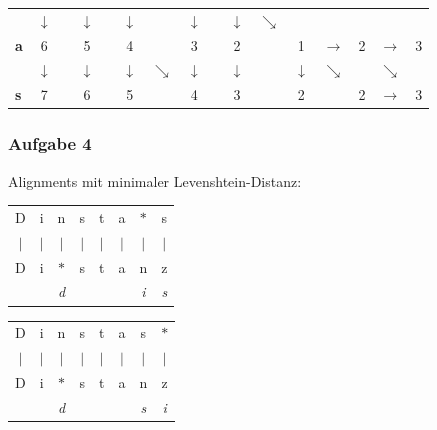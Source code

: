 \documentclass{beamer}
\begin{document}
\begin{frame}
\begin{tabular}{l|ccccccccccccccc}
				& $\downarrow$ &       & $\downarrow$ &       & $\downarrow$ &       & $\downarrow$ &       & $\downarrow$ & $\searrow$ &       &       &       &       &  \\
				\textbf{a}     & 6     &       & 5     &       & 4     &       & 3     &       & 2     &       & 1     & $\rightarrow$ & 2     & $\rightarrow$ & 3 \\
				& $\downarrow$ &       & $\downarrow$ &       & $\downarrow$ & $\searrow$ & $\downarrow$ &       & $\downarrow$ &       & $\downarrow$ & $\searrow$ &       & $\searrow$ &  \\
				\textbf{s}     & 7     &       & 6     &       & 5     &       & 4     &       & 3     &       & 2     &       & 2     & $\rightarrow$ & 3 \\
			\end{tabular}
\end{frame}

\begin{frame} \frametitle{Aufgabe 4}
	Alignments mit minimaler Levenshtein-Distanz:
	
	\centering
	
	\begin{tabular}{cccccccc}
		D & i & n & s & t & a & $\ast$ & s \\
		$|$ & $|$ & $|$ & $|$ & $|$ & $|$ & $|$ & $|$ \\
		D & i & $\ast$ & s & t & a & n & z \\
		  &   & \textit{d} &   &   &   & \textit{i} & \textit{s} \\
	\end{tabular}

	\vspace{3em}
	
	\begin{tabular}{cccccccc}
		D & i & n & s & t & a & s & $\ast$ \\
		$|$ & $|$ & $|$ & $|$ & $|$ & $|$ & $|$ & $|$ \\
		D & i & $\ast$ & s & t & a & n & z \\
		&   & \textit{d} &   &   &   & \textit{s} & \textit{i} \\
	\end{tabular}
\end{frame}



\end{document}
